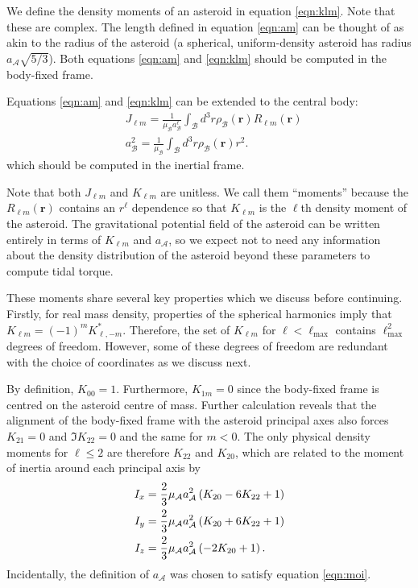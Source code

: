 We define the density moments of an asteroid in equation \ref{eqn:klm}.
Note that these are complex. The length defined in equation \ref{eqn:am} can be thought of as akin to the radius of the asteroid (a spherical, uniform-density asteroid has radius $a_\mathcal{A}\sqrt{5/3} $). Both equations \ref{eqn:am} and \ref{eqn:klm} should be computed in the body-fixed frame.

Equations \ref{eqn:am} and \ref{eqn:klm} can be extended to the central body:
\begin{equation}
  \begin{split}
    &J_{\ell m} = \frac{1}{\mu_\mathcal{B} a_\mathcal{B}^\ell} \int_\mathcal{B} d^3 r \rho_\mathcal{B}(\bm r) R_{\ell m}(\bm r)\\
    &a_\mathcal{B}^2 = \frac{1}{\mu_\mathcal{B}} \int_\mathcal{B} d^3 r \rho_\mathcal{B}(\bm r) r^2.
  \end{split}
  \label{eqn:jlm}
\end{equation}
which should be computed in the inertial frame.

Note that both $J_{\ell m}$ and $K_{\ell m}$ are unitless. We call them ``moments'' because the $R_{\ell m}(\bm r)$ contains an $r^\ell$ dependence so that $K_{\ell m}$ is the $\ell$th density moment of the asteroid. The gravitational potential field of the asteroid can be written entirely in terms of $K_{\ell m}$ and $a_\mathcal{A}$, so we expect not to need any information about the density distribution of the asteroid beyond these parameters to compute tidal torque.

These moments share several key properties which we discuss before continuing. Firstly, for real mass density, properties of the spherical harmonics imply that $K_{\ell m} = (-1)^m K_{\ell, -m}^*$. Therefore, the set of $K_{\ell m}$ for $\ell < \ell_\text{max}$ contains $\ell_\text{max}^2$ degrees of freedom. However, some of these degrees of freedom are redundant with the choice of coordinates as we discuss next.

By definition, $K_{00}=1$. Furthermore, $K_{1m} = 0$ since the body-fixed frame is centred on the asteroid centre of mass. Further calculation reveals that the alignment of the body-fixed frame with the asteroid principal axes also forces $K_{21}= 0$ and $\Im K_{22}=0$ and the same for $m<0$. The only physical density moments for $\ell \leq 2$ are therefore $K_{22}$ and $K_{20}$, which are related to the moment of inertia around each principal axis by
\begin{equation}
  \begin{split}
    I_x &= \frac{2}{3}\mu_\mathcal{A} a_\mathcal{A}^2 \left( K_{20} - 6 K_{22} + 1 \right)\\
    I_y &= \frac{2}{3}\mu_\mathcal{A} a_\mathcal{A}^2 \left( K_{20} + 6 K_{22} + 1 \right)\\
    I_z &= \frac{2}{3}\mu_\mathcal{A} a_\mathcal{A}^2 \left( -2K_{20} + 1 \right).
  \end{split}
  \label{eqn:moi}
\end{equation}
Incidentally, the definition of $a_\mathcal{A}$ was chosen to satisfy equation \ref{eqn:moi}.

